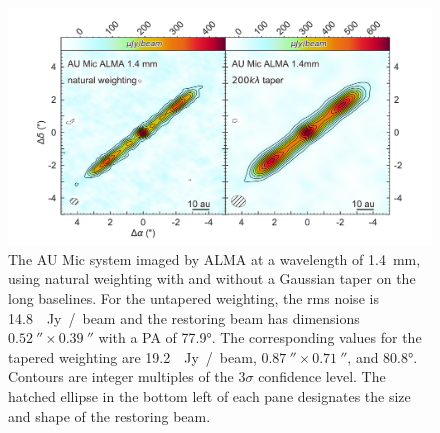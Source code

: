 \documentclass[12pt,oneside]{article}
\begin{document}
\begin{figure}
  \includegraphics[width=\linewidth]{figures/aumic_imaged}
  \caption{The AU Mic system imaged by ALMA at a wavelength of \SI{1.4}{mm}, using natural weighting with and without a Gaussian taper on the long baselines. 
  For the untapered weighting, the rms noise is \SI{14.8}{\mu Jy / beam} and the restoring beam has dimensions $\SI{0.52}{''} \times \SI{0.39}{''}$ with a PA of \ang{77.9}.
  The corresponding values for the tapered weighting are \SI{19.2}{\mu Jy / beam}, $\SI{0.87}{''} \times \SI{0.71}{''}$, and \ang{80.8}. 
  Contours are integer multiples of the $3\sigma$ confidence level.
  The hatched ellipse in the bottom left of each pane designates the size and shape of the restoring beam.
  }
  \label{fig: aumic_imaged}
\end{figure}
\end{document}
